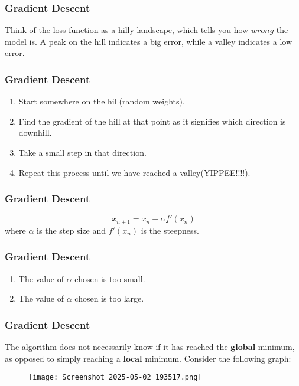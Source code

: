 \documentclass{beamer}
\begin{document}
\begin{frame}
\frametitle{Gradient Descent}
\begin{tcolorbox}
[colback=blue!5!white,colframe=blue!75!black,title=An Analogy for Gradient Descent]
Think of the loss function as a hilly landscape, which tells you how $\textit{wrong}$ the model is. A peak on the hill indicates a big error, while a valley indicates a low error.
\end{tcolorbox}
\end{frame}
\begin{frame}
\frametitle{Gradient Descent}
\begin{tcolorbox}
[colback=blue!5!white,colframe=blue!75!black,title= How Gradient Descent Works]
\begin{enumerate}
    \item Start somewhere on the hill(random weights).
    \item Find the gradient of the hill at that point as it signifies which direction is downhill.
    \item Take a small step in that direction.
    \item Repeat this process until we have reached a valley(YIPPEE!!!!).
\end{enumerate}
\end{tcolorbox}
\end{frame}
\begin{frame}
\frametitle{Gradient Descent}
\begin{tcolorbox}
[colback=blue!5!white,colframe=blue!75!black,title= Mathematical Formulation of Gradient Descent]
$$x_{n+1}=x_n-\alpha f'(x_n)$$
where $\alpha$ is the step size and $f'(x_n)$ is the steepness.
\end{tcolorbox}
\end{frame}
\begin{frame}
\frametitle{Gradient Descent}
\begin{tcolorbox}
[colback=blue!5!white,colframe=blue!75!black,title= Problems Associated with Gradient Descent]
\begin{enumerate}
    \item The value of $\alpha$ chosen is too small.
    \item The value of $\alpha$ chosen is too large.
\end{enumerate}
\end{tcolorbox}
\end{frame}
\begin{frame}
\frametitle{Gradient Descent}
\begin{tcolorbox}
[colback=blue!5!white,colframe=blue!75!black,title= Problems Associated with Gradient Descent]
The algorithm does not necessarily know if it has reached the $\textbf{global}$ minimum, as opposed to simply reaching a $\textbf{local}$ minimum. Consider the following graph:
\begin{figure}
    \centering
    \texttt{[image: Screenshot 2025-05-02 193517.png]}
\end{figure}
\end{tcolorbox}
\end{frame}
\end{document}
